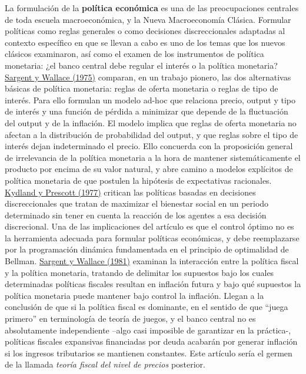\documentclass{nuevotema}
\begin{document}
La formulación de la \textbf{política económica} es una de las preocupaciones centrales de toda escuela macroeconómica, y la Nueva Macroeconomía Clásica. Formular políticas como reglas generales o como decisiones discreccionales adaptadas al contexto específico en que se llevan a cabo es uno de los temas que los nuevos clásicos examinaron, así como el examen de los instrumentos de política monetaria: ¿el banco central debe regular el interés o la política monetaria? \underline{Sargent y Wallace (1975)} comparan, en un trabajo pionero, las dos alternativas básicas de política monetaria: reglas de oferta monetaria o reglas de tipo de interés. Para ello formulan un modelo ad-hoc que relaciona precio, output y tipo de interés y una función de pérdida a minimizar que depende de la fluctuación del output y de la inflación. El modelo implica que reglas de oferta monetaria no afectan a la distribución de probabilidad del output, y que reglas sobre el tipo de interés dejan indeterminado el precio. Ello concuerda con la proposición general de irrelevancia de la política monetaria a la hora de mantener sistemáticamente el producto por encima de su valor natural, y abre camino a modelos explícitos de política monetaria de que postulen la hipótesis de expectativas racionales. \underline{Kydland y Prescott (1977)} critican las políticas basadas en decisiones discreccionales que tratan de maximizar el bienestar social en un periodo determinado sin tener en cuenta la reacción de los agentes a esa decisión discrecional. Una de las implicaciones del artículo es que el control óptimo no es la herramienta adecuada para formular políticas económicas, y debe reemplazarse por la programación dinámica fundamentada en el principio de optimalidad de Bellman. \underline{Sargent y Wallace (1981)} examinan la interacción entre la política fiscal y la política monetaria, tratando de delimitar los supuestos bajo los cuales determinadas políticas fiscales resultan en inflación futura y bajo qué supuestos la política monetaria puede mantener bajo control la inflación. Llegan a la conclusión de que si la política fiscal es dominante, en el sentido de que ``juega primero'' en terminología de teoría de juegos, y el banco central no es absolutamente independiente --algo casi imposible de garantizar en la práctica-, políticas fiscales expansivas financiadas por deuda acabarán por generar inflación si los ingresos tributarios se mantienen constantes. Este artículo sería el germen de la llamada \textit{teoría fiscal del nivel de precios} posterior. 
\end{document}
